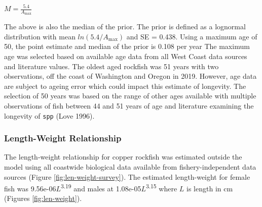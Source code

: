 \documentclass[11pt,
  english,
  a4paper,
]{article}
\begin{document}
\leavevmode\tagmcend\tagstructend\par

\begin{centering}

$M=\frac{5.4}{A_{\text{max}}}$

\end{centering}


The above is also the median of the prior. The prior is defined as a lognormal distribution with mean {\(ln(5.4/A_{\text{max}})\)\leavevmode\tagmcend\tagstructend} and SE = 0.438. Using a maximum age of 50, the point estimate and median of the prior is 0.108 per year The maximum age was selected based on available age data from all West Coast data sources and literature values. The oldest aged rockfish was 51 years with two observations, off the coast of Washington and Oregon in 2019. However, age data are subject to ageing error which could impact this estimate of longevity. The selection of 50 years was based on the range of other ages available with multiple observations of fish between 44 and 51 years of age and literature examining the longevity of \texttt{spp} {(Love 1996)\leavevmode\tagmcend\tagstructend}.

\leavevmode\tagmcend\tagstructend\par


\hypertarget{length-weight-relationship}{%
\subsubsection{Length-Weight Relationship}\label{length-weight-relationship}}

\leavevmode\tagmcend\tagstructend


The length-weight relationship for copper rockfish was estimated outside the model using all coastwide biological data available from fishery-independent data sources (Figure \ref{fig:len-weight-survey}). The estimated length-weight for female fish was 9.56e-06{\(L\)\leavevmode\tagmcend\tagstructend}\textsuperscript{3.19} and males at 1.08e-05{\(L\)\leavevmode\tagmcend\tagstructend}\textsuperscript{3.15} where {\(L\)\leavevmode\tagmcend\tagstructend} is length in cm (Figures \ref{fig:len-weight}).
\end{document}
